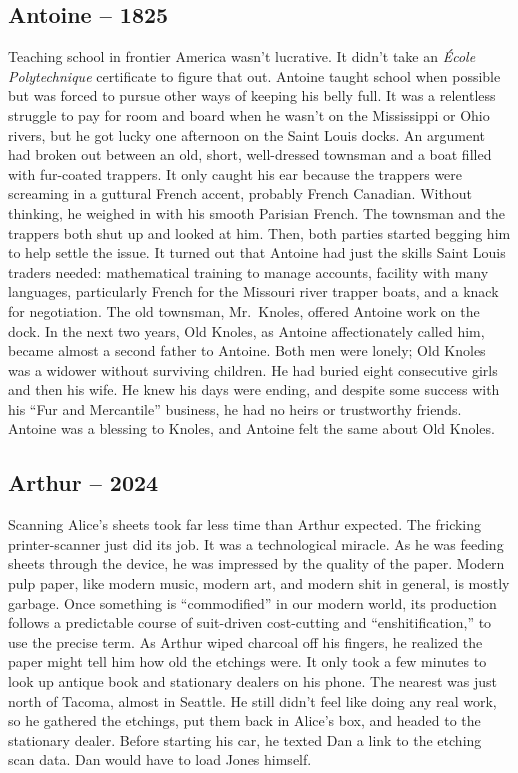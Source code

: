 \hypertarget{antoine-1825}{%
\subsection*{Antoine -- 1825}\label{antoine-1825}}

Teaching school in frontier America wasn't lucrative. It didn't take an
\emph{École Polytechnique} certificate to figure that out. Antoine
taught school when possible but was forced to pursue other ways of
keeping his belly full. It was a relentless struggle to pay for room and
board when he wasn't on the Mississippi or Ohio rivers, but he got lucky
one afternoon on the Saint Louis docks. An argument had broken out
between an old, short, well-dressed townsman and a boat filled with
fur-coated trappers. It only caught his ear because the trappers were
screaming in a guttural French accent, probably French Canadian. Without
thinking, he weighed in with his smooth Parisian French. The townsman
and the trappers both shut up and looked at him. Then, both parties
started begging him to help settle the issue. It turned out that Antoine
had just the skills Saint Louis traders needed: mathematical training to
manage accounts, facility with many languages, particularly French for
the Missouri river trapper boats, and a knack for negotiation. The old
townsman, Mr.~Knoles, offered Antoine work on the dock. In the next two
years, Old Knoles, as Antoine affectionately called him, became almost a
second father to Antoine. Both men were lonely; Old Knoles was a widower
without surviving children. He had buried eight consecutive girls and
then his wife. He knew his days were ending, and despite some success
with his ``Fur and Mercantile'' business, he had no heirs or trustworthy
friends. Antoine was a blessing to Knoles, and Antoine felt the same
about Old Knoles.

\hypertarget{arthur-2024-2}{%
\subsection*{Arthur -- 2024}\label{arthur-2024-2}}

Scanning Alice's sheets took far less time than Arthur expected. The
fricking printer-scanner just did its job. It was a technological
miracle. As he was feeding sheets through the device, he was impressed
by the quality of the paper. Modern pulp paper, like modern music,
modern art, and modern shit in general, is mostly garbage. Once
something is ``commodified'' in our modern world, its production follows
a predictable course of suit-driven cost-cutting and
``enshitification,'' to use the precise term. As Arthur wiped charcoal
off his fingers, he realized the paper might tell him how old the
etchings were. It only took a few minutes to look up antique book and
stationary dealers on his phone. The nearest was just north of Tacoma,
almost in Seattle. He still didn't feel like doing any real work, so he
gathered the etchings, put them back in Alice's box, and headed to the
stationary dealer. Before starting his car, he texted Dan a link to the
etching scan data. Dan would have to load Jones himself.

